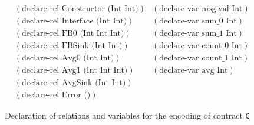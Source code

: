 \begin{figure}[ht]
	\centering
	\begin{align*}
    & (\text{declare-rel Constructor (Int Int)}) && (\text{declare-var msg.val Int}) & \\
    & (\text{declare-rel Interface (Int Int)}) && (\text{declare-var sum\_0 Int}) \\
    & (\text{declare-rel FB0 (Int Int Int)}) && (\text{declare-var sum\_1 Int}) \\
    & (\text{declare-rel FBSink (Int Int)}) && (\text{declare-var count\_0 Int}) \\
    & (\text{declare-rel Avg0 (Int Int)}) && (\text{declare-var count\_1 Int}) \\
    & (\text{declare-rel Avg1 (Int Int Int)}) && (\text{declare-var avg Int}) \\
    & (\text{declare-rel AvgSink (Int Int)}) && \\
    & (\text{declare-rel Error ()}) &&
	\end{align*}
	\caption{Declaration of relations and variables for the encoding of contract \texttt{C}}
	\label{fig:chc_rel-and-var}
\end{figure}



